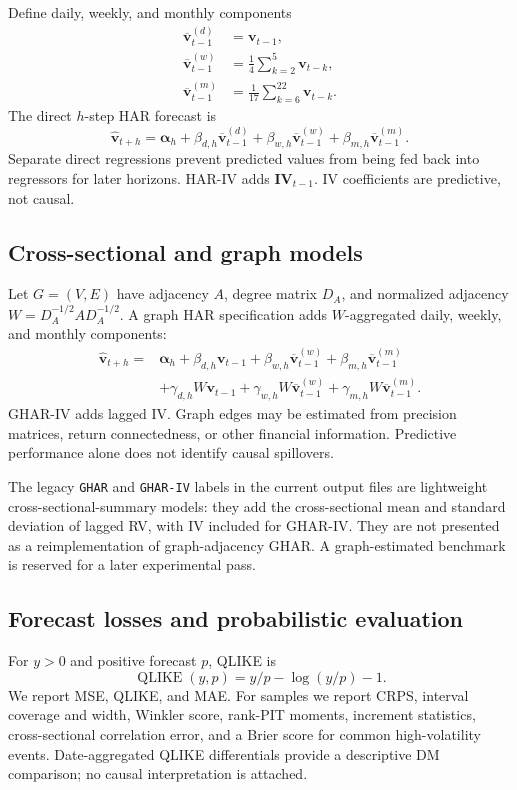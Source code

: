 \documentclass[11pt]{article}
\begin{document}
Define daily, weekly, and monthly components
\begin{align} \overline{\mathbf v}_{t-1}^{(d)}&=\mathbf v_{t-1},\\ \overline{\mathbf v}_{t-1}^{(w)}&=\frac14\sum_{k=2}^{5}\mathbf v_{t-k},\\ \overline{\mathbf v}_{t-1}^{(m)}&=\frac1{17}\sum_{k=6}^{22}\mathbf v_{t-k}. \end{align}
The direct $h$-step HAR forecast is
\begin{equation}\widehat{\mathbf v}_{t+h}=\boldsymbol\alpha_h+\beta_{d,h}\overline{\mathbf v}_{t-1}^{(d)}+\beta_{w,h}\overline{\mathbf v}_{t-1}^{(w)}+\beta_{m,h}\overline{\mathbf v}_{t-1}^{(m)}.\end{equation}
Separate direct regressions prevent predicted values from being fed back into regressors for later horizons. HAR-IV adds $\mathbf{IV}_{t-1}$. IV coefficients are predictive, not causal.

\subsection{Cross-sectional and graph models}
Let $G=(V,E)$ have adjacency $A$, degree matrix $D_A$, and normalized adjacency $W=D_A^{-1/2}AD_A^{-1/2}$. A graph HAR specification adds $W$-aggregated daily, weekly, and monthly components:
\begin{align}\widehat{\mathbf v}_{t+h}={}&\boldsymbol\alpha_h+\beta_{d,h}\mathbf v_{t-1}+\beta_{w,h}\overline{\mathbf v}_{t-1}^{(w)}+\beta_{m,h}\overline{\mathbf v}_{t-1}^{(m)}\\&+\gamma_{d,h}W\mathbf v_{t-1}+\gamma_{w,h}W\overline{\mathbf v}_{t-1}^{(w)}+\gamma_{m,h}W\overline{\mathbf v}_{t-1}^{(m)}.\end{align}
GHAR-IV adds lagged IV. Graph edges may be estimated from precision matrices, return connectedness, or other financial information. Predictive performance alone does not identify causal spillovers.

The legacy \texttt{GHAR} and \texttt{GHAR-IV} labels in the current output files are lightweight cross-sectional-summary models: they add the cross-sectional mean and standard deviation of lagged RV, with IV included for GHAR-IV. They are not presented as a reimplementation of graph-adjacency GHAR. A graph-estimated benchmark is reserved for a later experimental pass.

\subsection{Forecast losses and probabilistic evaluation}
For $y>0$ and positive forecast $p$, QLIKE is
\begin{equation}\operatorname{QLIKE}(y,p)=y/p-\log(y/p)-1.\end{equation}
We report MSE, QLIKE, and MAE. For samples we report CRPS, interval coverage and width, Winkler score, rank-PIT moments, increment statistics, cross-sectional correlation error, and a Brier score for common high-volatility events. Date-aggregated QLIKE differentials provide a descriptive DM comparison; no causal interpretation is attached.
\end{document}

